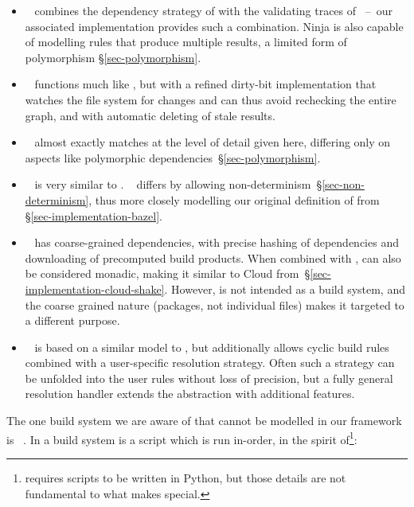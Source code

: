 \begin{itemize}
\item \Ninja~\cite{ninja} combines the dependency strategy of \Make with the
validating traces of \Shake~--~our associated implementation provides such a
combination. Ninja is also capable of modelling rules that produce multiple
results, a limited form of polymorphism \S\ref{sec-polymorphism}.

\item \Tup~\cite{tup} functions much like \Make, but with a refined dirty-bit
implementation that watches the file system for changes and can thus avoid
rechecking the entire graph, and with automatic deleting of stale results.

\item \Redo~\cite{redo} almost exactly matches \Shake at the level of detail
given here, differing only on aspects like polymorphic
dependencies~\S\ref{sec-polymorphism}.

\item \Buck~\cite{buck} is very similar to \Bazel. \CloudBuild~\cite{esfahani2016cloudbuild}
differs by allowing non-determinism~\S\ref{sec-non-determinism}, thus more closely modelling
our original definition of \Bazel from \S\ref{sec-implementation-bazel}.

\item \Nix~\cite{dolstra2004nix} has coarse-grained dependencies, with precise
hashing of dependencies and downloading of precomputed build products. When
combined with , \Nix can also be considered monadic,
making it similar to Cloud \Shake from~\S\ref{sec-implementation-cloud-shake}.
However, \Nix is not intended as a build system, and the coarse grained nature
(packages, not individual files) makes it targeted to a different purpose.

\item \Pluto~\cite{erdweg2015pluto} is based on a similar model to \Shake, but
additionally allows cyclic build rules combined with a user-specific resolution
strategy. Often such a strategy can be unfolded into the user rules without loss
of precision, but a fully general resolution handler extends the 
abstraction with additional features.
\end{itemize}

The one build system we are aware of that cannot be modelled in our framework is
\Fabricate~\cite{fabricate}. In \Fabricate a build system is a script which is
run in-order, in the spirit of\footnote{\Fabricate requires scripts to be
written in Python, but those details are not fundamental to what makes
\Fabricate special.}:

